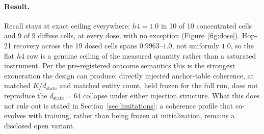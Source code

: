 \paragraph{Result.} Recall stays at exact ceiling everywhere: $h4 = 1.0$
in 10 of 10 concentrated cells %
and 9 of 9 diffuse cells, %
at every dose, with no exception (Figure~\ref{fig:dose}). Hop-21
recovery across the 19 dosed cells spans $0.9963$--$1.0$, not uniformly
$1.0$, so the flat $h4$ row is a genuine ceiling of the measured quantity
rather than a saturated instrument. %
Per the pre-registered outcome semantics this is the strongest
exoneration the design can produce: directly injected anchor-table
coherence, at matched $K/d_{\mathrm{state}}$ and matched entity count,
held frozen for the full run, does not reproduce the
$d_{\mathrm{state}}=64$ collapse under either injection structure. What
this does not rule out is stated in Section~\ref{sec:limitations}: a
coherence profile that co-evolves with training, rather than being frozen
at initialization, remains a disclosed open variant.
